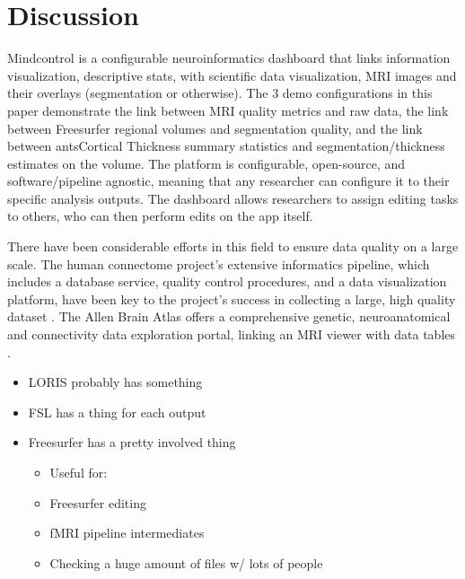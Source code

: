 \section{Discussion}

Mindcontrol is a configurable neuroinformatics dashboard that links information visualization, descriptive stats, with scientific data visualization, MRI images and their overlays (segmentation or otherwise). The 3 demo configurations in this paper demonstrate the link between MRI quality metrics and raw data, the link between Freesurfer regional volumes and segmentation quality, and the link between antsCortical Thickness summary statistics and segmentation/thickness estimates on the volume. The platform is configurable, open-source, and software/pipeline agnostic, meaning that any researcher can configure it to their specific analysis outputs. The dashboard allows researchers to assign editing tasks to others, who can then perform edits on the app itself. 

There have been considerable efforts in this field to ensure data quality on a large scale. The human connectome project's extensive informatics pipeline, which includes a database service, quality control procedures, and a data visualization platform, have been key to the project's success in collecting a large, high quality dataset \cite{Marcus_2013}. The Allen Brain Atlas offers a comprehensive genetic, neuroanatomical and connectivity data exploration portal, linking an MRI viewer with data tables \cite{Sunkin_2012}.

\begin{itemize}
\item LORIS probably has something
\item FSL has a thing for each output
\item Freesurfer has a pretty involved thing
    \begin{itemize}
    \item Useful for:
    \item Freesurfer editing
    \item fMRI pipeline intermediates
    \item Checking a huge amount of files w/ lots of people
    \end{itemize}
\end{itemize}



